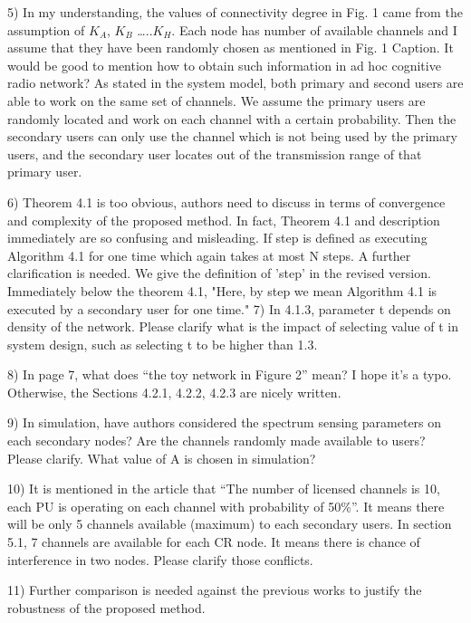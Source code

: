 \documentclass[10pt,a4paper]{article}
\begin{document}
    5)  In my understanding, the values of connectivity degree in Fig. 1 came from the assumption of $K_A$, $K_B$ …..$K_H$. Each node has number of available channels and I assume that they have been randomly chosen as mentioned in Fig. 1 Caption. It would be good to mention how to obtain such information in ad hoc cognitive radio network?
    As stated in the system model, both primary and second users are able to work on the same set of channels. 
    We assume the primary users are randomly located and work on each channel with a certain probability.
    Then the secondary users can only use the channel which is not being used by the primary users, and the secondary user locates out of the transmission range of that primary user.
    
    6)  Theorem 4.1 is too obvious, authors need to discuss in terms of convergence and complexity of the proposed method. In fact, Theorem 4.1 and description immediately are so confusing and misleading. If step is defined as executing Algorithm 4.1 for one time which again takes at most N steps. A further clarification is needed.
    We give the definition of 'step' in the revised version.
    Immediately below the theorem 4.1, "Here, by step we mean Algorithm 4.1 is executed by a secondary user for one time."
    7)  In 4.1.3, parameter t depends on density of the network. Please clarify what is the impact of selecting value of t in system design, such as selecting t to be higher than 1.3.
    
    8)  In page 7, what does “the toy network in Figure 2” mean? I hope it’s a typo. Otherwise, the Sections 4.2.1, 4.2.2, 4.2.3 are nicely written.
    
    9)  In simulation, have authors considered the spectrum sensing parameters on each secondary nodes? Are the channels randomly made available to users? Please clarify. What value of A is chosen in simulation?
    
    10) It is mentioned in the article that “The number of licensed channels is 10, each PU is operating on each channel with probability of 50\%”. It means there will be only 5 channels available (maximum) to each secondary users. In section 5.1, 7 channels are available for each CR node. It means there is chance of interference in two nodes. Please clarify those conflicts.
    
    11) Further comparison is needed against the previous works to justify the robustness of the proposed method.
\end{document}
